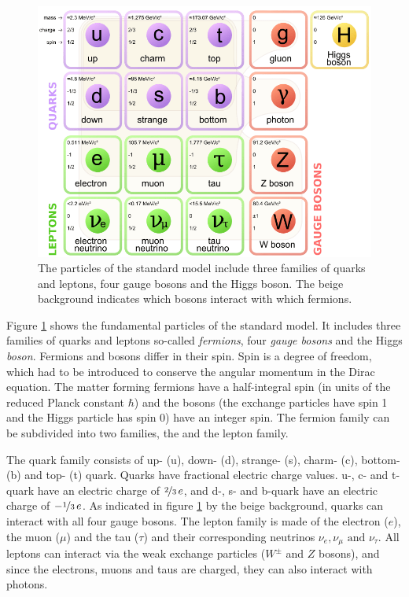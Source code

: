 \documentclass[a4paper,11pt,twosided,final,german,openbib,pdftex,listof=totoc,bibliography=totoc]{scrbook}
\begin{document}
\begin{figure}[h!]
	\centering
	\includegraphics[width=\textwidth]{Bilder/SM.png}
	\caption[Standard Model]{The particles of the standard model include three families of quarks and leptons, four gauge bosons and the Higgs boson. The beige background indicates which bosons interact with which fermions. \cite{SMFigure}}
	\label{fig:SM}
\end{figure}



Figure \ref{fig:SM} shows the fundamental particles of the standard model. It includes three families of quarks and leptons so-called \textit{fermions}, four \textit{gauge bosons} and the Higgs \textit{boson}. Fermions and bosons differ in their spin. Spin is a degree of freedom, which had to be introduced to conserve the angular momentum in the Dirac equation. The matter forming fermions have a half-integral spin (in units of the reduced Planck constant $\hbar$) and the bosons (the exchange particles have spin 1 and the Higgs particle has spin 0) have an integer spin. The fermion family can be subdivided into two families, the  and the lepton family. 

The quark family consists of up- (u), down- (d), strange- (s), charm- (c), bottom- (b) and top- (t) quark. Quarks have fractional electric charge values. u-, c- and t-quark have an electric charge of $\nicefrac{2}{3} \,e$, and d-, s- and b-quark have an electric charge of $-\nicefrac{1}{3} \,e$. As indicated in figure \ref{fig:SM} by the beige background, quarks can interact with all four gauge bosons.
The lepton family is made of the electron ($e$), the muon ($\mu$) and the tau ($\tau$) and their corresponding neutrinos $\nu_e,\nu_{\mu} \textrm{ and } \nu_{\tau}$. All leptons can interact via the weak exchange particles ($W^{\pm}$ and $Z$ bosons), and since the electrons, muons and taus are charged, they can also interact with photons.
\end{document}

